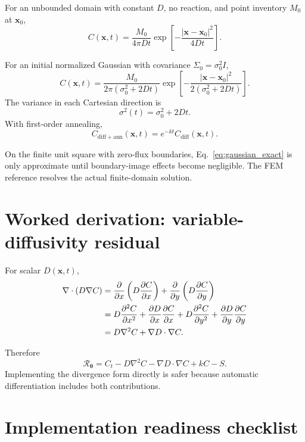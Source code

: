 \documentclass[11pt]{article}
\newcommand{\thetav}{\bm{\theta}}
\newcommand{\xv}{\bm{x}}
\newcommand{\Rnet}{\mathcal{R}_{\thetav}}
\begin{document}
For an unbounded domain with constant $D$, no reaction, and point inventory $M_0$ at $\xv_0$,
\begin{equation}
C(\xv,t)
=
\frac{M_0}{4\pi Dt}
\exp\left[
-\frac{|\xv-\xv_0|^2}{4Dt}
\right].
\end{equation}

For an initial normalized Gaussian with covariance $\Sigma_0=\sigma_0^2I$,
\begin{equation}
C(\xv,t)
=
\frac{M_0}
{2\pi(\sigma_0^2+2Dt)}
\exp\left[
-\frac{|\xv-\xv_0|^2}
{2(\sigma_0^2+2Dt)}
\right].
\label{eq:gaussian_exact}
\end{equation}
The variance in each Cartesian direction is
\begin{equation}
\sigma^2(t)=\sigma_0^2+2Dt.
\end{equation}
With first-order annealing,
\begin{equation}
C_{\mathrm{diff+ann}}(\xv,t)
=
e^{-kt}C_{\mathrm{diff}}(\xv,t).
\end{equation}

On the finite unit square with zero-flux boundaries, Eq.~\eqref{eq:gaussian_exact} is only approximate until boundary-image effects become negligible. The FEM reference resolves the actual finite-domain solution.

\section{Worked derivation: variable-diffusivity residual}

For scalar $D(\xv,t)$,
\begin{align}
\nabla\cdot(D\nabla C)
&=
\pdv{}{x}\left(D\pdv{C}{x}\right)
+\pdv{}{y}\left(D\pdv{C}{y}\right)
\\
&=
D\pdv[2]{C}{x}
+\pdv{D}{x}\pdv{C}{x}
+D\pdv[2]{C}{y}
+\pdv{D}{y}\pdv{C}{y}
\\
&=
D\nabla^2C+\nabla D\cdot\nabla C.
\end{align}

Therefore
\begin{equation}
\Rnet
=
C_t
-D\nabla^2C
-\nabla D\cdot\nabla C
+kC-S.
\end{equation}
Implementing the divergence form directly is safer because automatic differentiation includes both contributions.

\section{Implementation readiness checklist}
\end{document}
